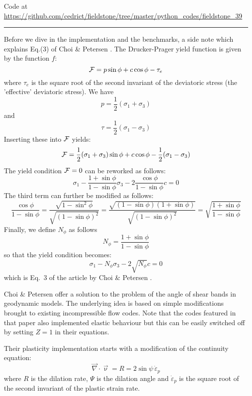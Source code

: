 

\begin{center}
Code at \url{https://github.com/cedrict/fieldstone/tree/master/python_codes/fieldstone_39}
\end{center}

\par\noindent\rule{\textwidth}{0.4pt}

Before we dive in the implementation and the benchmarks, a side note which explains Eq.(3) 
of 
Choi \& Petersen \cite{chpe15}.
The Drucker-Prager yield function is given by the function $f$:
\[
{\cal F} = p \sin\phi + c\cos \phi - \tau_e
\]
where $\tau_e$ is the square root of the second invariant of the deviatoric stress
(the 'effective' deviatoric stress).
We have
\[
p=\frac{1}{2}(\sigma_1+\sigma_3) 
\]
and 
\[
\tau = \frac{1}{2}(\sigma_1-\sigma_3)
\]
Inserting these into ${\cal F}$ yields:
\[
{\cal F}= \frac{1}{2}(\sigma_1+\sigma_3) \sin\phi + c \cos\phi - \frac{1}{2}(\sigma_1-\sigma_3)
\]
The yield condition ${\cal F}=0$ can be reworked as follows:
\[
\sigma_1 - \frac{1 + \sin\phi}{1-\sin\phi} \sigma_3 - 2 \frac{\cos \phi}{1-\sin\phi} c = 0
\]
The third term can further be modified as follows:
\[
\frac{\cos \phi}{1-\sin\phi}
=\frac{\sqrt{1-\sin^2 \phi}}{\sqrt{(1-\sin\phi)^2}}
=\frac{\sqrt{(1-\sin \phi)(1+\sin\phi)}}{\sqrt{(1-\sin\phi)^2}}
=\sqrt{
\frac{1+\sin\phi}{1-\sin\phi}
}
\]
Finally, we define $N_\phi$ as follows 
\[
N_\phi=\frac{1+\sin \phi}{1-\sin\phi}
\]
so that the yield condition becomes:
\[
\sigma_1 - N_\phi \sigma_3 - 2 \sqrt{N_\phi} c = 0
\]
which is Eq.~3 of the article by Choi \& Petersen \cite{chpe15}.

\vspace{1cm}

Choi \& Petersen offer a solution to the problem of the angle of shear bands in 
geodynamic models. The underlying idea is based on simple modifications 
brought to existing incompressible flow codes. Note that the codes
featured in that paper also implemented elastic behaviour but this can 
be easily switched off by setting $Z=1$ in their equations.

Their plasticity implementation starts with a modification of the 
continuity equation:
\[
\vec\nabla\cdot\vec\upnu = R = 2 \sin\psi \, \dot{\varepsilon}_p
\]
where $R$ is the dilation rate, $\Psi$ is the dilation angle 
and $\dot{\varepsilon}_p$ is the square root of 
the second invariant of the plastic strain rate.

